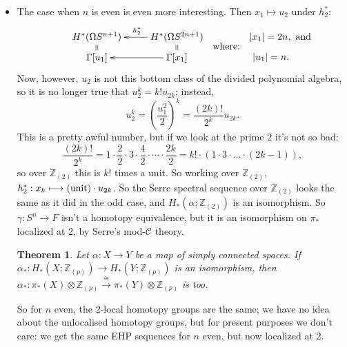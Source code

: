 \documentclass{article}
\newcommand{\Z}{\mathbb{Z}}
\newcommand{\Loops}{\Omega}
\renewcommand{\to}{\longrightarrow}
\renewcommand{\mapsto}{\longmapsto}
\newtheorem{thm}{Theorem}[section]
\theoremstyle{definition}
\begin{document}
\begin{itemize}
which \emph{are} homotopic by the Whitehead theorem; since $\tilde \gamma$ is equivariant with respect to deck transformations, $\gamma: F \to S^1$ is a homotopy equivalence (\textbf{I do not understand this}).  So now for n odd we have the homotopy fibration $S^n \to \Loops S^{n+1} \to \Loops S^{2n+1}$ whose long exact sequence is the EHP sequence
\[
\cdots \to \pi_i (S^n) \stackrel{e}{\to} \pi_{i+1} (S^{n+1}) \stackrel{h}{\to} \pi_{i+1} (S^{2n+1}) \stackrel{p}{\to} \pi_{i-1} (S^n) \stackrel{e}{\to} \pi_i (S^{n+1}) \to \cdots
\]
\item The case when $n$ is even is even more interesting. Then $x_1\mapsto u_2$ under $h_2^*$:
\[\xymatrix@R=.5em{
\ar@{=}[d]H^*(\Omega S^{n+1})&H^*(\Omega S^{2n+1})\ar[l]_{h_2^*}\ar@{=}[d]\\
\Gamma[u_1]&\Gamma[x_1]\ar[l]
}
\raisebox{-1em}{\ \ where:\ \ }
\xymatrix@R=.5em{
|x_1|=2n,\makebox[0cm][l]{ and }\\
|u_1|=n.
}
\]
Now, however, $u_2$ is not this bottom class of the divided polynomial algebra, so it is no longer true that $u_2^k = k! u_{2k}$; instead,
\[u_2^k=\left(\frac{u_1^2}{2}\right)^k=\frac{(2k)!}{2^k}u_{2k}.\]
This is a pretty awful number, but if we look at the prime $2$ it's not so bad:
\[
\frac{(2k)!}{2^k} = 1 \cdot \frac{2}{2} \cdot 3 \cdot \frac{4}{2} \cdot \cdots \cdot \frac{2k}{2} = k!\cdot(1\cdot3\cdot\ldots\cdot(2k-1))
,\]
so over $\Z_{(2)}$ this is $k!$ times a unit.  So working over $\Z_{(2)}$, $h_2^* : x_k \mapsto (\textup{unit})\cdot u_{2k}$.  So the Serre spectral sequence over $\Z_{(2)}$ looks the same as it did in the odd case, and $H_*(\alpha; \Z_{(2)})$ is an isomorphism.  So $\gamma: S^n \to F$ isn't a homotopy equivalence, but it is an isomorphism on $\pi_*$ localized at 2, by Serre's mod-$\mathscr{C}$ theory.
\begin{thm}
Let $\alpha: X \to Y$ be a map of simply connected spaces.  If $\alpha_*: H_*(X; \Z_{(p)}) \to H_*(Y; \Z_{(p)})$ is an isomorphism, then $\alpha_*: \pi_* (X) \otimes \Z_{(p)} \stackrel{\cong}{\to} \pi_* (Y) \otimes \Z_{(p)}$ is too.
\end{thm}
So for $n$ even, the $2$-local homotopy groups are the same; we have no idea about the unlocalised homotopy groups, but for present purposes we don't care: we get the same EHP sequences for $n$ even, but now localized at 2.
\end{itemize}

\pagebreak
\end{document}
